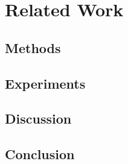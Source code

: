 \documentclass[11pt,a4paper]{article}
\let\ArticleSubsection\subsection
\let\ArticleSubsubsection\subsubsection
\let\ArticleParagraph\paragraph
\newcommand{\inputchapter}[1]{%
  \begingroup
    \let\section\ArticleSubsection
    \let\subsection\ArticleSubsubsection
    \let\subsubsection\ArticleParagraph
    \par
  \endgroup
}
\begin{document}
\section{Related Work}
\label{c.related}
\inputchapter{chapter/related.tex}

\section{Methods}
\label{c.methods}
\inputchapter{chapter/methods.tex}
\FloatBarrier

\section{Experiments}
\label{c.experiments}
\inputchapter{chapter/experiments.tex}

\FloatBarrier

\section{Discussion}
\label{c.discussion}
\inputchapter{chapter/discussion.tex}

\section{Conclusion}
\label{c.conclusion}
\inputchapter{chapter/conclusion.tex}

\FloatBarrier
\label{page.nonreferences.end}

\begingroup
  \small
  \singlespacing
  \setlength{\bibsep}{4pt}
  
\endgroup
\end{document}

